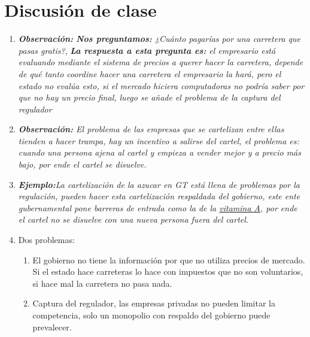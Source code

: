 \section{Discusión de clase}
\begin{enumerate}
    \item \emph{\textbf{Observación: }\textbf{Nos preguntamos:} ¿Cuánto pagarías por una carretera que pasas gratis?}, \emph{\textbf{La respuesta a esta pregunta es: }el empresario está evaluando mediante el sistema de precios a querer hacer la carretera, depende de qué tanto coordine hacer una carretera el empresario la hará, pero el estado no evalúa esto, si el mercado hiciera computadoras no podría saber por que no hay un precio final, luego se añade el problema de la captura del regulador}
    \item \emph{\textbf{Observación: }El problema de las empresas que se cartelizan entre ellas tienden a hacer trampa, hay un incentivo a salirse del cartel, el problema es: cuando una persona ajena al cartel y empieza a vender mejor y a precio más bajo, por ende el cartel se disuelve.}
    \item \emph{\textbf{Ejemplo:}La cartelización de la azucar en GT está llena de problemas por la regulación, pueden hacer esta cartelización respaldada del gobierno, este ente gubernamental pone barreras de entrada como la de la \underline{vitamina A}, por ende el cartel no se disuelve con una nueva persona fuera del cartel}.
    \item Dos problemas:
        \begin{enumerate}
            \item El gobierno no tiene la información por que no utiliza precios de mercado. Si el estado hace carreteras lo hace con impuestos que no son voluntarios, si hace mal la carretera no pasa nada.
            \item Captura del regulador, las empresas privadas no pueden limitar la competencia, solo un monopolio con respaldo del gobierno puede prevalecer.
        \end{enumerate}
\end{enumerate}

